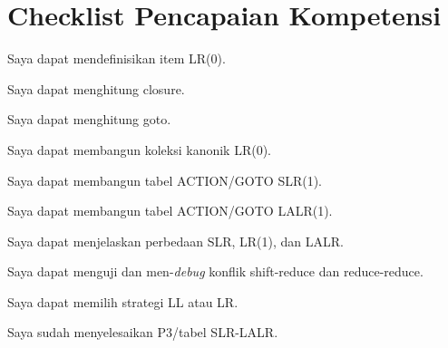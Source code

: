 \section*{Checklist Pencapaian Kompetensi}

\begin{checklist}
  \item Saya dapat mendefinisikan item LR(0).
  \item Saya dapat menghitung closure.
  \item Saya dapat menghitung goto.
  \item Saya dapat membangun koleksi kanonik LR(0).
  \item Saya dapat membangun tabel ACTION/GOTO SLR(1).
  \item Saya dapat membangun tabel ACTION/GOTO LALR(1).
  \item Saya dapat menjelaskan perbedaan SLR, LR(1), dan LALR.
  \item Saya dapat menguji dan men-\textit{debug} konflik shift-reduce
        dan reduce-reduce.
  \item Saya dapat memilih strategi LL atau LR.
  \item Saya sudah menyelesaikan P3/tabel SLR-LALR.
\end{checklist}
